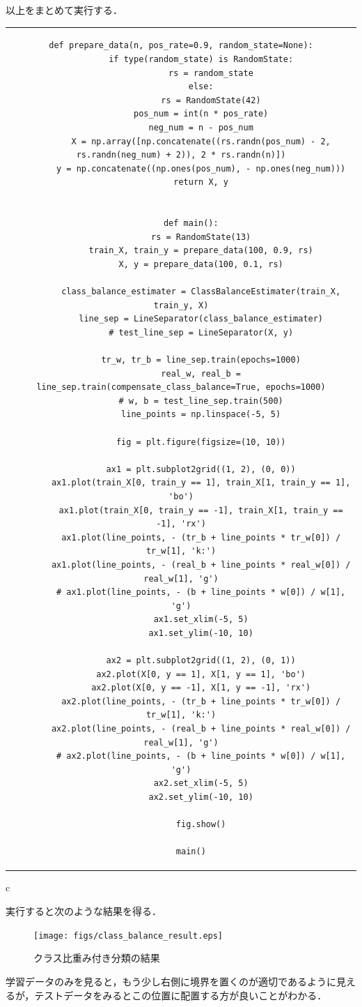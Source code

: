 \documentclass[dvipdfmx]{jsarticle}
\begin{document}
以上をまとめて実行する．
\begin{center}
\begin{tabular}{c}
  \begin{lstlisting}[]
    def prepare_data(n, pos_rate=0.9, random_state=None):
        if type(random_state) is RandomState:
            rs = random_state
        else:
            rs = RandomState(42)
        pos_num = int(n * pos_rate)
        neg_num = n - pos_num
        X = np.array([np.concatenate((rs.randn(pos_num) - 2, rs.randn(neg_num) + 2)), 2 * rs.randn(n)])
        y = np.concatenate((np.ones(pos_num), - np.ones(neg_num)))
        return X, y


    def main():
        rs = RandomState(13)
        train_X, train_y = prepare_data(100, 0.9, rs)
        X, y = prepare_data(100, 0.1, rs)

        class_balance_estimater = ClassBalanceEstimater(train_X, train_y, X)
        line_sep = LineSeparator(class_balance_estimater)
        # test_line_sep = LineSeparator(X, y)

        tr_w, tr_b = line_sep.train(epochs=1000)
        real_w, real_b = line_sep.train(compensate_class_balance=True, epochs=1000)
        # w, b = test_line_sep.train(500)
        line_points = np.linspace(-5, 5)

        fig = plt.figure(figsize=(10, 10))

        ax1 = plt.subplot2grid((1, 2), (0, 0))
        ax1.plot(train_X[0, train_y == 1], train_X[1, train_y == 1], 'bo')
        ax1.plot(train_X[0, train_y == -1], train_X[1, train_y == -1], 'rx')
        ax1.plot(line_points, - (tr_b + line_points * tr_w[0]) / tr_w[1], 'k:')
        ax1.plot(line_points, - (real_b + line_points * real_w[0]) / real_w[1], 'g')
        # ax1.plot(line_points, - (b + line_points * w[0]) / w[1], 'g')
        ax1.set_xlim(-5, 5)
        ax1.set_ylim(-10, 10)

        ax2 = plt.subplot2grid((1, 2), (0, 1))
        ax2.plot(X[0, y == 1], X[1, y == 1], 'bo')
        ax2.plot(X[0, y == -1], X[1, y == -1], 'rx')
        ax2.plot(line_points, - (tr_b + line_points * tr_w[0]) / tr_w[1], 'k:')
        ax2.plot(line_points, - (real_b + line_points * real_w[0]) / real_w[1], 'g')
        # ax2.plot(line_points, - (b + line_points * w[0]) / w[1], 'g')
        ax2.set_xlim(-5, 5)
        ax2.set_ylim(-10, 10)

        fig.show()

    main()
  \end{lstlisting}
\end{tabular}{c}
\end{center}

実行すると次のような結果を得る．
\begin{figure}[h]
  \begin{center}
    \texttt{[image: figs/class\_balance\_result.eps]}
  \end{center}
  \caption{クラス比重み付き分類の結果}
\end{figure}

学習データのみを見ると，もう少し右側に境界を置くのが適切であるように見えるが，テストデータをみるとこの位置に配置する方が良いことがわかる．
\end{document}

